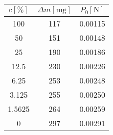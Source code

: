 \begin{tabular}{ccc}                                                                    \toprule
$c [\si{\percent}]$   &   $\Delta m [\si{\milli\gram}]$ &   $P_0 [\si{\newton}]$    \\  \midrule
100                   &   117                           &   0.00115                 \\
50                    &   151                           &   0.00148                 \\
25                    &   190                           &   0.00186                 \\
12.5                  &   230                           &   0.00226                 \\
6.25                  &   253                           &   0.00248                 \\
3.125                 &   255                           &   0.00250                 \\
1.5625                &   264                           &   0.00259                 \\
0                     &   297                           &   0.00291                 \\  \bottomrule
\end{tabular}